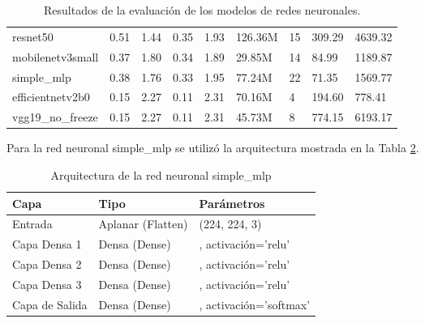 \documentclass[10pt,a4paper,twocolumn,twoside]{article}
\begin{document}
\begin{table}[h]
\begin{tabular}{@{}lllllllll@{}}
  resnet50                            & 0.51                    & 1.44                & 0.35                  & 1.93              & 126.36M         & 15              & 309.29                  & 4639.32           \\
  mobilenetv3small                    & 0.37                    & 1.80                & 0.34                  & 1.89              & 29.85M          & 14              & 84.99                   & 1189.87           \\
  simple\_mlp                         & 0.38                    & 1.76                & 0.33                  & 1.95              & 77.24M          & 22              & 71.35                   & 1569.77           \\
  efficientnetv2b0                    & 0.15                    & 2.27                & 0.11                  & 2.31              & 70.16M          & 4               & 194.60                  & 778.41            \\
  vgg19\_no\_freeze                   & 0.15                    & 2.27                & 0.11                  & 2.31              & 45.73M          & 8               & 774.15                  & 6193.17           \\
  \bottomrule
  \end{tabular}
  \caption{Resultados de la evaluación de los modelos de redes neuronales.}
  \label{tab:models_full}
\end{table}

Para la red neuronal simple\_mlp se utilizó la arquitectura mostrada en la Tabla \ref{tab:arqsimplemlp}.

\begin{table}[h]
  \centering
  \begin{tabular}{>{\centering\arraybackslash}m{3cm} >{\centering\arraybackslash}m{3cm} >{\centering\arraybackslash}m{3cm}}
  \toprule
  \textbf{Capa} & \textbf{Tipo} & \textbf{Parámetros} \\
  \midrule
  Entrada & Aplanar (Flatten) & (224, 224, 3) \\
  \midrule
  Capa Densa 1 & Densa (Dense) & 512, activación='relu' \\
  \midrule
  Capa Densa 2 & Densa (Dense) & 256, activación='relu' \\
  \midrule
  Capa Densa 3 & Densa (Dense) & 128, activación='relu' \\
  \midrule
  Capa de Salida & Densa (Dense) & 10, activación='softmax' \\
  \bottomrule
  \end{tabular}
  \caption{Arquitectura de la red neuronal simple\_mlp}
  \label{tab:arqsimplemlp}
\end{table}
\end{document}
